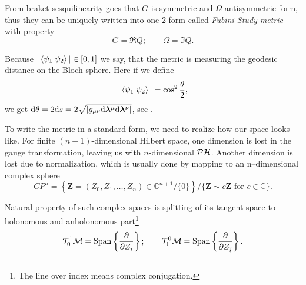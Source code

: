 From braket sesquilinearity goes that $G$ is symmetric and $\Omega$ antisymmetric form, thus they can be uniquely written into one 2-form called \emph{Fubini-Study metric} with property
\begin{equation}
    G=\Re Q ;\qquad \Omega=\Im Q.
\end{equation}

Because $|\braket{\psi_1|\psi_2}|\in[0,1]$ we say, that the metric is measuring the geodesic distance on the Bloch sphere. Here if we define
\begin{equation}
    |\braket{\psi_1|\psi_2}|=\cos^2 \frac{\theta}{2},
\end{equation}
we get $\mathrm{d} \theta= 2\mathrm{d} s=2\sqrt{|g_{\mu\nu}\mathrm{d} {\bm\lambda}^\mu\mathrm{d} {\bm\lambda}^\nu|}$, see \citet{cheng_quantum_2013}.

To write the metric in a standard form, we need to realize how our space looks like. For finite $(n+1)$-dimensional Hilbert space, one dimension is lost in the gauge transformation, leaving us with $n$-dimensional $\mathcal{PH}$. Another dimension is lost due to normalization, which is usually done by mapping to an n--dimensional complex sphere
$$CP^n= \left\{ \bm Z=(Z_0,Z_1,\dots,Z_n)\in \mathbb{C}^{n+1}/\{0\} \right\}\Big/ \{\bm Z\sim c\bm Z \text{ for } c\in \mathbb{C}\}.$$

Natural property of such complex spaces is splitting of its tangent space to holonomous and anholonomous part\footnote{The line over index means complex conjugation.}
$$\mathcal T^1_0\mathcal{M}=\text{Span}\left\{\frac{\partial}{\partial Z_i}\right\}; \qquad \mathcal T^0_1\mathcal{M}=\text{Span}\left\{\frac{\partial}{\partial Z_{\overline{i}}}\right\}.$$






